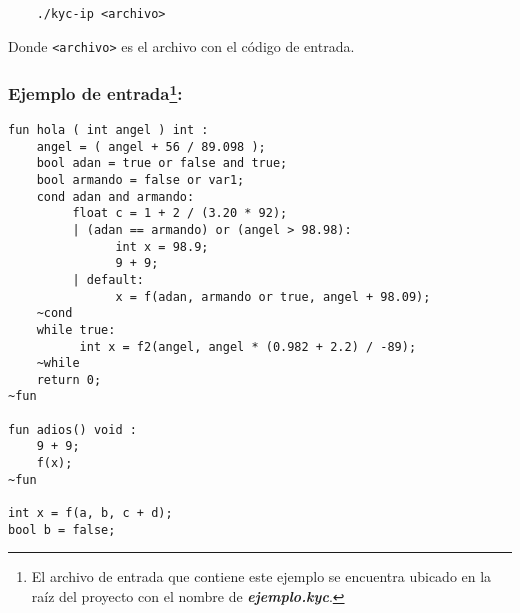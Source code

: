 \documentclass[12pt]{article}
\begin{document}
\begin{verbatim}
    ./kyc-ip <archivo>
\end{verbatim}
Donde \texttt{<archivo>} es el archivo con el código de entrada.

\subsubsection*{Ejemplo de entrada\footnote{El archivo de entrada que contiene este ejemplo se encuentra ubicado en la raíz del proyecto con el nombre de \textbf{\textit{ejemplo.kyc}}. }:}
\begin{verbatim}
fun hola ( int angel ) int : 
    angel = ( angel + 56 / 89.098 );
    bool adan = true or false and true;
    bool armando = false or var1;
    cond adan and armando:
         float c = 1 + 2 / (3.20 * 92);
         | (adan == armando) or (angel > 98.98):
               int x = 98.9;
               9 + 9;
         | default:
               x = f(adan, armando or true, angel + 98.09);            
    ~cond
    while true:
          int x = f2(angel, angel * (0.982 + 2.2) / -89);            
    ~while
    return 0;
~fun

fun adios() void :
    9 + 9;
    f(x);
~fun

int x = f(a, b, c + d);
bool b = false;
\end{verbatim}
\end{document}
